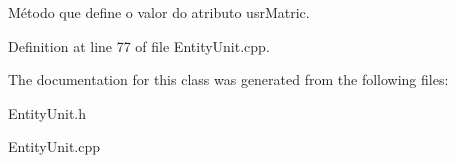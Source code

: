 Método que define o valor do atributo usr\-Matric. 



Definition at line 77 of file Entity\-Unit.\-cpp.



The documentation for this class was generated from the following files\-:\begin{DoxyCompactItemize}
\item 
Entity\-Unit.\-h\item 
Entity\-Unit.\-cpp\end{DoxyCompactItemize}
